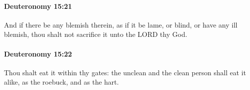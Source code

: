		\paragraph{Deuteronomy 15:21} %
			\label{DEUTERONOMY-15-21}

			And if there be any blemish therein, as if it be lame, or blind, or have any ill blemish, thou shalt not sacrifice it unto the LORD thy God.


		\paragraph{Deuteronomy 15:22} %
			\label{DEUTERONOMY-15-22}

			Thou shalt eat it within thy gates: the unclean and the clean person shall eat it alike, as the roebuck, and as the hart.


